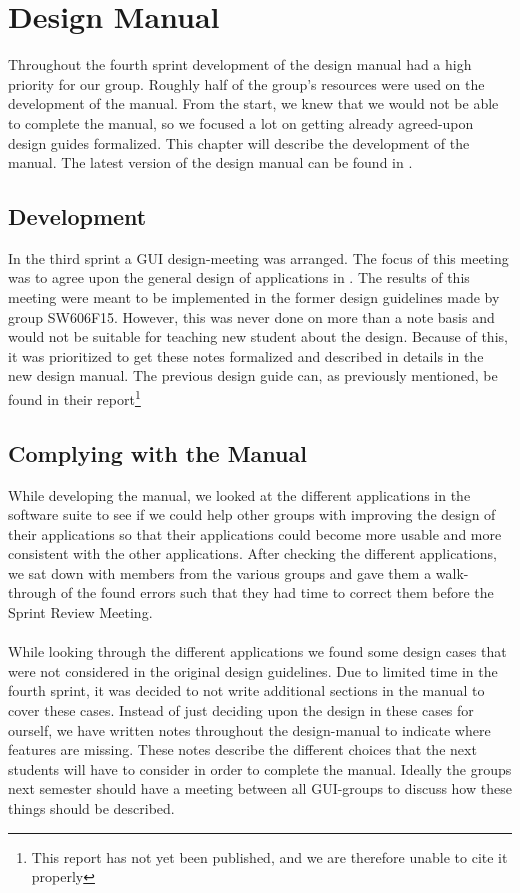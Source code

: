 
\chapter{Design Manual}
\label{cha:design_manual}

Throughout the fourth sprint development of the design manual had a high priority for our group. Roughly half of the group's resources were used on the development of the manual. From the start, we knew that we would not be able to complete the manual, so we focused a lot on getting already agreed-upon design guides formalized. This chapter will describe the development of the manual. The latest version of the design manual can be found in .

\section{Development}
\label{sec:development}
In the third sprint a GUI design-meeting was arranged. The focus of this meeting was to agree upon the general design of applications in \giraf. The results of this meeting were meant to be implemented in the former design guidelines made by group SW606F15. However, this was never done on more than a note basis and would not be suitable for teaching new student about the design. Because of this, it was prioritized to get these notes formalized and described in details in the new design manual. The previous design guide can, as previously mentioned, be found in their report\footnote{This report has not yet been published, and we are therefore unable to cite it properly}

\section{Complying with the Manual}
\label{sec:complying_with_the_manual}
While developing the manual, we looked at the different applications in the \giraf software suite to see if we could help other groups with improving the design of their applications so that their applications could become more usable and more consistent with the other applications. After checking the different applications, we sat down with members from the various groups and gave them a walk-through of the found errors such that they had time to correct them before the Sprint Review Meeting. 
\\\\
While looking through the different applications we found some design cases that were not considered in the original design guidelines. Due to limited time in the fourth sprint, it was decided to not write additional sections in the manual to cover these cases. Instead of just deciding upon the design in these cases for ourself, we have written notes throughout the design-manual to indicate where features are missing. These notes describe the different choices that the next students will have to consider in order to complete the manual. Ideally the groups next semester should have a meeting between all GUI-groups to discuss how these things should be described.